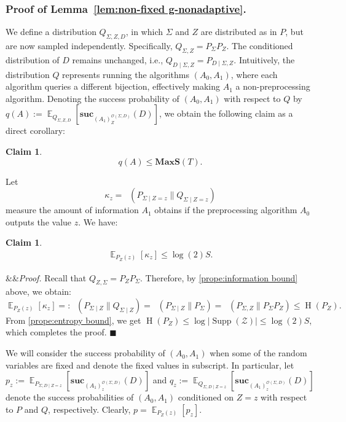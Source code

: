 \documentclass[11pt]{article}
\renewenvironment{proof}[1][]
    {\noindent
       \ifx&#1&{\it Proof.}
       \else{\it Proof ({#1}).}
       \fi}{\hfill $\blacksquare$}
\newtheorem{claim}[theorem]{Claim}
\DeclareMathOperator*{\E}{\mathbb{E}}
\DeclareMathOperator{\HH}{H}
\DeclareMathOperator{\KL}{D_{\text{KL}}}
\DeclareMathOperator{\Supp}{\text{Supp}}
\newcommand{\SECV}{{D}}
\newcommand{\SUC}{\boldsymbol{suc}}
\newcommand{\MAXS}{\boldsymbol{MaxS}}
\begin{document}
\subsubsection{Proof of Lemma~\ref{lem:non-fixed g-nonadaptive}.}
We define a distribution $Q_{\Sigma,Z,\SECV}$, in which $\Sigma$ and $Z$ are distributed as in $P$, but are now sampled independently. Specifically, $Q_{\Sigma,Z} = P_\Sigma P_Z$. The conditioned distribution of $\SECV$ remains unchanged, i.e., $Q_{\SECV \mid \Sigma,Z} = P_{\SECV \mid \Sigma,Z}$. Intuitively, the distribution $Q$ represents running the algorithms $(A_0,A_1)$, where each algorithm queries a different bijection, effectively making $A_1$ a non-preprocessing algorithm. Denoting the success probability of $(A_0,A_1)$ with respect to $Q$ by
$q(A) := \E_{Q_{\Sigma,Z,\SECV}}
[\SUC_{(A_1)_{Z}^{\mathcal{O}(\Sigma,\SECV)}}(\SECV)]$, we obtain the following claim as a direct corollary:

\begin{claim} \label{clm:non-fixed basic}
$$
q(A)
\leq 
\MAXS(T).$$
\end{claim}

\noindent Let
$$\kappa_{z} =  \KL( P_{\Sigma \mid Z = z} \| Q_{\Sigma \mid Z = z} )$$
measure the amount of information $A_1$ obtains if the preprocessing algorithm $A_0$ outputs the value $z$. We have:


\begin{claim} \label{clm:non-fixed klz}
\begin{align} 
\E_{P_{Z}(z)}[\kappa_{z}] \leq \log(2) S.
\end{align}
\end{claim}

\begin{proof}
Recall that $Q_{Z,\Sigma} = P_Z P_\Sigma$. Therefore, by \ref{prope:information bound} above, we obtain:
\[
    \E_{P_{Z}(z)}[\kappa_{z}] =: \KL( P_{\Sigma \mid Z} \| Q_{\Sigma \mid Z} ) = \KL( P_{\Sigma \mid Z} \| P_{\Sigma} ) = \KL(P_{\Sigma,Z} \| P_\Sigma P_Z) \le \HH(P_Z).
\]
From \ref{prope:entropy bound}, we get $\HH(P_Z) \le \log|\Supp(\mathcal{Z})| \leq \log(2) S$, which completes the proof.
\end{proof}

\medskip 

We will consider the success probability of $(A_0,A_1)$ when some of the random variables are fixed and denote the fixed values in subscript. 
In particular, let
$p_z := \E_{P_{\Sigma,\SECV \mid Z=z}}[\SUC_{(A_1)_{z}^{\mathcal{O}(\Sigma,\SECV)}}(\SECV)]$ 
and 
$q_z := \E_{Q_{\Sigma,\SECV \mid Z=z}}[\SUC_{(A_1)_{z}^{\mathcal{O}(\Sigma,\SECV)}}(\SECV)]$ 
denote the success probabilities of $(A_0,A_1)$ conditioned on $Z=z$ with respect to $P$ and $Q$, respectively. 
Clearly, $p = \E_{P_Z(z)} [p_z]$.
\end{document}
